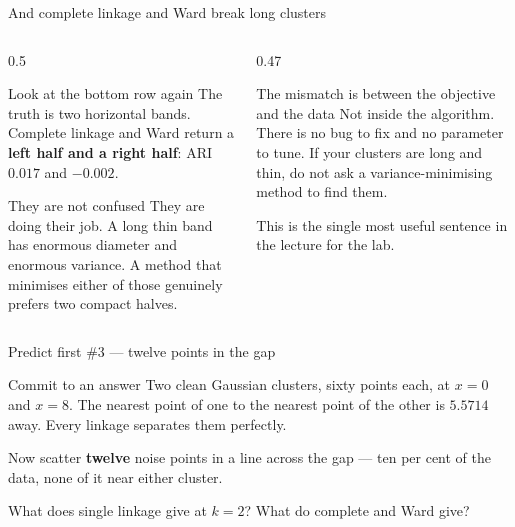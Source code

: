 \documentclass[aspectratio=169]{beamer}
\begin{document}
\begin{frame}[shrink=7]{And complete linkage and Ward break long clusters}
  \begin{columns}[T]
    \begin{column}{0.5\textwidth}
      \begin{block}{Look at the bottom row again}
        The truth is two horizontal bands. Complete linkage and Ward return a
        \textbf{left half and a right half}: ARI $0.017$ and $-0.002$.
      \end{block}
      \begin{exampleblock}{They are not confused}
        They are doing their job. A long thin band has enormous diameter and
        enormous variance. A method that minimises either of those genuinely
        prefers two compact halves.
      \end{exampleblock}
    \end{column}
    \begin{column}{0.47\textwidth}
      \begin{alertblock}{The mismatch is between the objective and the data}
        Not inside the algorithm. There is no bug to fix and no parameter to
        tune. If your clusters are long and thin, do not ask a
        variance-minimising method to find them.

        \medskip
        This is the single most useful sentence in the lecture for the lab.
      \end{alertblock}
    \end{column}
  \end{columns}
\end{frame}

\begin{frame}{Predict first \#3 --- twelve points in the gap}
  \begin{alertblock}{Commit to an answer}
    Two clean Gaussian clusters, sixty points each, at $x = 0$ and $x = 8$.
    The nearest point of one to the nearest point of the other is
    $\mathbf{5.5714}$ away. Every linkage separates them perfectly.

    \medskip
    Now scatter \textbf{twelve} noise points in a line across the gap --- ten
    per cent of the data, none of it near either cluster.

    \medskip
    \centering\large
    What does single linkage give at $k = 2$? What do complete and Ward give?
  \end{alertblock}
\end{frame}
\end{document}
